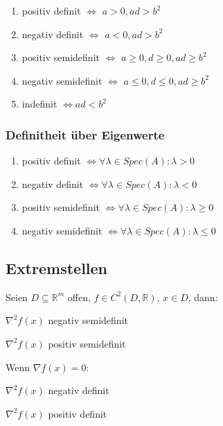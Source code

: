 \begin{enumerate}[label=(\alph*)]
	\item positiv definit $\Leftrightarrow$ $a > 0, ad > b^2$
	\item negativ definit $\Leftrightarrow$ $a < 0, ad > b^2$
	\item positiv semidefinit $\Leftrightarrow$ $a \geq 0, d \geq 0, ad \geq b^2$
	\item negativ semidefinit $\Leftrightarrow$ $a \leq 0, d \leq 0, ad \geq b^2$
	\item indefinit $\Leftrightarrow ad < b^2$
\end{enumerate}

\subsubsection*{Definitheit über Eigenwerte}

\begin{enumerate}[label=(\alph*)]
	\item positiv definit $\Leftrightarrow \forall \lambda \in Spec(A) : \lambda > 0$
	\item negativ definit $\Leftrightarrow \forall \lambda \in Spec(A) : \lambda < 0$
	\item positiv semidefinit $\Leftrightarrow \forall \lambda \in Spec(A) : \lambda \geq 0$
	\item negativ semidefinit $\Leftrightarrow \forall \lambda \in Spec(A) : \lambda \leq 0$
\end{enumerate}

\subsection*{Extremstellen}

Seien $D \subseteq \mathbb{R}^m$ offen, $f \in C^2(D, \mathbb{R})$, $x \in D$, dann:

\begin{description}[leftmargin=!,labelwidth=28mm]
	\item[Maximum] $\nabla^2 f(x)$ negativ semidefinit
	\item[Minimum] $\nabla^2 f(x)$ positiv semidefinit
\end{description}

Wenn $\nabla f(x) = 0$:

\begin{description}[leftmargin=!,labelwidth=28mm]
	\item[Maximum (strikt)] $\nabla^2 f(x)$ negativ definit
	\item[Minimum (strikt)] $\nabla^2 f(x)$ positiv definit
\end{description}

